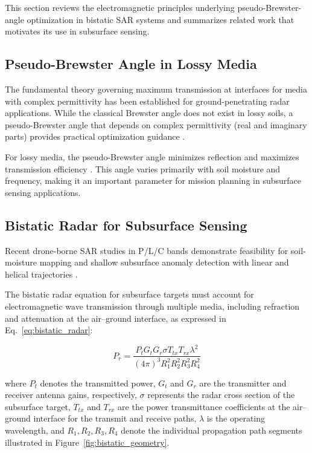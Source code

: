 \documentclass[conference]{IEEEtran}
\begin{document}
This section reviews the electromagnetic principles underlying pseudo-Brewster-angle optimization in bistatic SAR systems and summarizes related work that motivates its use in subsurface sensing.

\subsection{Pseudo-Brewster Angle in Lossy Media}

The fundamental theory governing maximum transmission at interfaces for media with complex permittivity has been established for ground-penetrating radar applications. While the classical Brewster angle does not exist in lossy soils, a pseudo-Brewster angle that depends on complex permittivity (real and imaginary parts) provides practical optimization guidance \cite{mcmichael_brewster}.

For lossy media, the pseudo-Brewster angle minimizes reflection and maximizes transmission efficiency \cite{mcmichael_brewster}. This angle varies primarily with soil moisture and frequency, making it an important parameter for mission planning in subsurface sensing applications.

\subsection{Bistatic Radar for Subsurface Sensing}

Recent drone-borne SAR studies in P/L/C bands demonstrate feasibility for soil-moisture mapping and shallow subsurface anomaly detection with linear and helical trajectories \cite{ore_soil_moisture}.

The bistatic radar equation for subsurface targets must account for electromagnetic wave transmission through multiple media, including refraction and attenuation at the air–ground interface, as expressed in Eq.~\ref{eq:bistatic_radar}:

\begin{equation}
P_r = \frac{P_t G_t G_r \sigma T_{tx} T_{rx} \lambda^2}{(4\pi)^3 R_1^2 R_2^2 R_3^2 R_4^2}
\label{eq:bistatic_radar}
\end{equation}

where $P_t$ denotes the transmitted power, $G_t$ and $G_r$ are the transmitter and receiver antenna gains, respectively, $\sigma$ represents the radar cross section of the subsurface target, $T_{tx}$ and $T_{rx}$ are the power transmittance coefficients at the air–ground interface for the transmit and receive paths, $\lambda$ is the operating wavelength, and $R_1, R_2, R_3, R_4$ denote the individual propagation path segments illustrated in Figure~\ref{fig:bistatic_geometry}.
\end{document}
